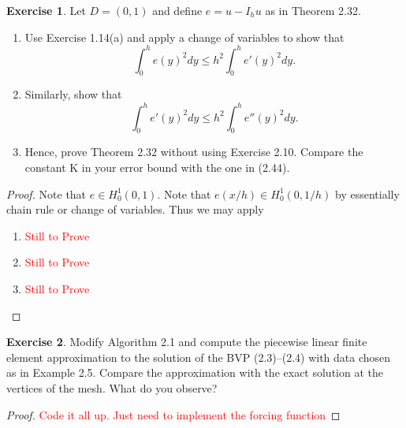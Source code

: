 \documentclass{amsart}
\theoremstyle{plain}
\theoremstyle{definition}
\newtheorem{exer}{Exercise}[section]
\newcommand{\tcr}[1]{\textcolor{red}{#1}}
\begin{document}
\begin{exer}
     Let $D = (0, 1)$ and define $e = u - I_h u$ as in Theorem 2.32.
    \begin{enumerate}[label=\alph*.]
        \item Use Exercise 1.14(a) and apply a change of variables to show that 
        $$\int_0^h e(y)^2 dy \leq h^2 \int_0^h  e'(y)^2 dy.$$
        \item Similarly, show that 
        $$\int_0^h e'(y)^2 dy \leq h^2 \int_0^h e''(y)^2 dy.$$
        \item  Hence, prove Theorem 2.32 without using Exercise 2.10. Compare the constant K in your error bound with the one in (2.44).
    \end{enumerate}
\end{exer}
\begin{proof}
    Note that $e\in H_0^1(0,1)$. Note that $e(x/h) \in H_0^1(0,1/h)$ by essentially chain rule or change of variables. Thus we may apply 
    \begin{enumerate}
        \item \tcr{Still to Prove}
        \item \tcr{Still to Prove}
        \item \tcr{Still to Prove}
    \end{enumerate}
\end{proof}

\begin{exer}
    Modify Algorithm 2.1 and compute the piecewise linear finite element approximation to the solution of the BVP (2.3)–(2.4) with data chosen as in Example 2.5. Compare the approximation with the exact solution at the vertices of the mesh. What do you observe?
\end{exer}
\begin{proof}
    \tcr{Code it all up. Just need to implement the forcing function} 
\end{proof}
\end{document}
